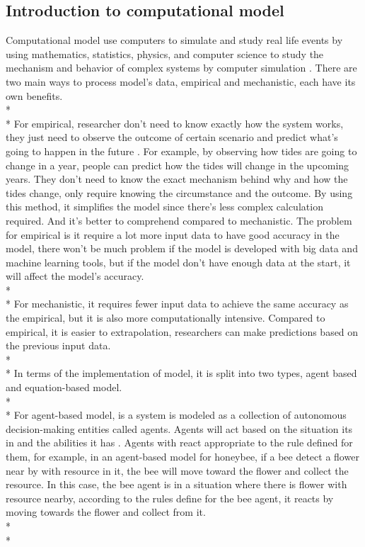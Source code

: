 \subsection{Introduction to computational model}
Computational model use computers to simulate and study real life events by using mathematics, statistics, physics, and computer science to study the mechanism and behavior of complex systems by computer simulation \cite{Reference1}. There are two main ways to process model’s data, empirical and mechanistic, each have its own benefits. \\*\\*
For empirical, researcher don’t need to know exactly how the system works, they just need to observe the outcome of certain scenario and predict what’s going to happen in the future \cite{Reference5}. For example, by observing how tides are going to change in a year, people can predict how the tides will change in the upcoming years. They don’t need to know the exact mechanism behind why and how the tides change, only require knowing the circumstance and the outcome. By using this method, it simplifies the model since there’s less complex calculation required. And it’s better to comprehend compared to mechanistic. The problem for empirical is it require a lot more input data to have good accuracy in the model, there won’t be much problem if the model is developed with big data and machine learning tools, but if the model don’t have enough data at the start, it will affect the model’s accuracy. \\*\\*
For mechanistic, it requires fewer input data to achieve the same accuracy as the empirical, but it is also more computationally intensive\cite{Reference5}. Compared to empirical, it is easier to extrapolation, researchers can make predictions based on the previous input data. \\*\\*
In terms of the implementation of model, it is split into two types, agent based and equation-based model. \\*\\* 
For agent-based model, is a system is modeled as a collection of autonomous decision-making entities called agents. Agents will act based on the situation its in and the abilities it has \cite{Reference6}. Agents with react appropriate to the rule defined for them, for example, in an agent-based model for honeybee, if a bee detect a flower near by with resource in it, the bee will move toward the flower and collect the resource. In this case, the bee agent is in a situation where there is flower with resource nearby, according to the rules define for the bee agent, it reacts by moving towards the flower and collect from it. \\*\\*
